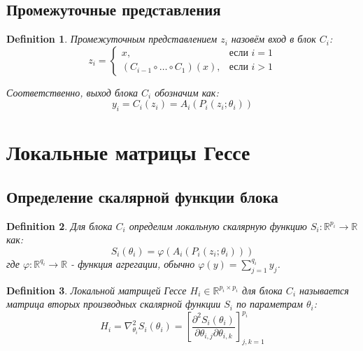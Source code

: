 \documentclass[12pt]{article}
\newtheorem{definition}{Definition}
\begin{document}
\subsection{Промежуточные представления}
\begin{definition}
Промежуточным представлением $z_i$ назовём вход в блок $C_i$:
\begin{equation}
z_i = 
\begin{cases}
x, & \text{если } i = 1 \\
(C_{i-1} \circ \ldots \circ C_1)(x), & \text{если } i > 1
\end{cases}
\end{equation}

Соответственно, выход блока $C_i$ обозначим как:
\begin{equation}
y_i = C_i(z_i) = A_i(P_i(z_i; \theta_i))
\end{equation}
\end{definition}

\section{Локальные матрицы Гессе}

\subsection{Определение скалярной функции блока}

\begin{definition}
Для блока $C_i$ определим локальную скалярную функцию $S_i: \mathbb{R}^{p_i} \rightarrow \mathbb{R}$ как:
\begin{equation}
S_i(\theta_i) = \varphi(A_i(P_i(z_i; \theta_i)))
\end{equation}
где $\varphi: \mathbb{R}^{q_i} \rightarrow \mathbb{R}$ - функция агрегации, обычно $\varphi(y) = \sum_{j=1}^{q_i} y_j$.
\end{definition}

\begin{definition}
Локальной матрицей Гессе $H_i \in \mathbb{R}^{p_i \times p_i}$ для блока $C_i$ называется матрица вторых производных скалярной функции $S_i$ по параметрам $\theta_i$:
\begin{equation}
H_i = \nabla_{\theta_i}^2 S_i(\theta_i) = \left[ \frac{\partial^2 S_i(\theta_i)}{\partial \theta_{i,j} \partial \theta_{i,k}} \right]_{j,k=1}^{p_i}
\end{equation}
\end{definition}
\end{document}

